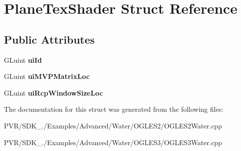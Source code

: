 \hypertarget{struct_plane_tex_shader}{\section{Plane\+Tex\+Shader Struct Reference}
\label{struct_plane_tex_shader}
}
\subsection*{Public Attributes}
\begin{DoxyCompactItemize}
\item 
\hypertarget{struct_plane_tex_shader_ad6ecfd3a86681f7c5ffb38e5b659b57c}{G\+Luint {\bfseries ui\+Id}}\label{struct_plane_tex_shader_ad6ecfd3a86681f7c5ffb38e5b659b57c}

\item 
\hypertarget{struct_plane_tex_shader_ae8b03f024940112fbcad9c5af83bfd04}{G\+Luint {\bfseries ui\+M\+V\+P\+Matrix\+Loc}}\label{struct_plane_tex_shader_ae8b03f024940112fbcad9c5af83bfd04}

\item 
\hypertarget{struct_plane_tex_shader_ae66b6aeee0b1d3c9996752b9ff8f980b}{G\+Luint {\bfseries ui\+Rcp\+Window\+Size\+Loc}}\label{struct_plane_tex_shader_ae66b6aeee0b1d3c9996752b9ff8f980b}

\end{DoxyCompactItemize}


The documentation for this struct was generated from the following files\+:\begin{DoxyCompactItemize}
\item 
P\+V\+R/\+S\+D\+K\+\_./\+Examples/\+Advanced/\+Water/\+O\+G\+L\+E\+S2/O\+G\+L\+E\+S2\+Water.\+cpp\item 
P\+V\+R/\+S\+D\+K\+\_./\+Examples/\+Advanced/\+Water/\+O\+G\+L\+E\+S3/O\+G\+L\+E\+S3\+Water.\+cpp\end{DoxyCompactItemize}
